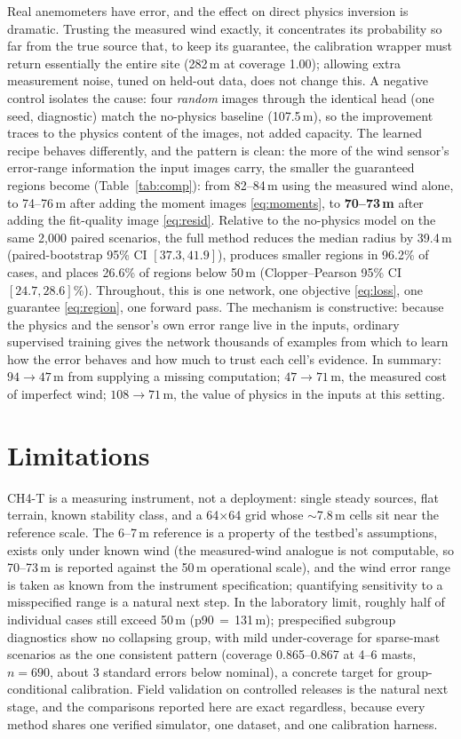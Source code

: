 \documentclass[conference]{IEEEtran}
\begin{document}
Real anemometers have error, and the effect on direct physics inversion
is dramatic. Trusting the measured wind exactly, it concentrates its
probability so far from the true source that, to keep its guarantee, the
calibration wrapper must return essentially the entire site
(282\,m at coverage 1.00); allowing extra measurement noise, tuned on
held-out data, does not change this. A negative control isolates the cause: four \emph{random} images
through the identical head (one seed, diagnostic) match the no-physics
baseline (107.5\,m), so the improvement traces to the physics content
of the images, not added capacity. The learned recipe behaves differently, and the pattern
is clean: the more of the wind sensor's
error-range information the input images carry, the smaller the
guaranteed regions become (Table~\ref{tab:comp}): from 82--84\,m using
the measured wind alone, to 74--76\,m after adding the moment images
\eqref{eq:moments}, to \textbf{70--73\,m} after adding the fit-quality
image \eqref{eq:resid}.
Relative to the no-physics model on the same 2{,}000 paired scenarios,
the full method reduces the median radius by 39.4\,m (paired-bootstrap
95\% CI $[37.3, 41.9]$), produces smaller regions in 96.2\% of cases,
and places 26.6\% of regions below 50\,m (Clopper--Pearson 95\% CI
$[24.7, 28.6]$\%). Throughout, this is one network, one objective \eqref{eq:loss}, one
guarantee \eqref{eq:region}, one forward pass. The mechanism is constructive: because the physics and the
sensor's own error range live in the inputs, ordinary supervised
training gives the network thousands of examples from which to learn how
the error behaves and how much to trust each cell's evidence. In summary: $94{\to}47$\,m from supplying a missing
computation; $47{\to}71$\,m, the measured cost of imperfect wind;
$108{\to}71$\,m, the value of physics in the inputs at this setting.

\section{Limitations}
CH4-T is a measuring instrument, not a deployment: single steady
sources, flat terrain, known stability class, and a 64$\times$64 grid
whose $\sim$7.8\,m cells sit near the reference scale. The 6--7\,m
reference is a property of the testbed's assumptions, exists only under
known wind (the measured-wind analogue is not computable, so 70--73\,m
is reported against the 50\,m operational scale), and the wind error
range is taken as known from the instrument specification; quantifying
sensitivity to a misspecified range is a natural next step. In the laboratory limit, roughly half of individual cases still
exceed
50\,m (p90\,$=$\,131\,m); prespecified subgroup diagnostics show no
collapsing group, with mild under-coverage for sparse-mast scenarios as
the one consistent pattern (coverage 0.865--0.867 at 4--6 masts,
$n{=}690$, about 3 standard errors below nominal), a concrete target for
group-conditional calibration. Field validation on
controlled releases is the natural next stage, and the comparisons
reported here are exact regardless, because every method shares one
verified simulator, one dataset, and one calibration harness.
\end{document}
